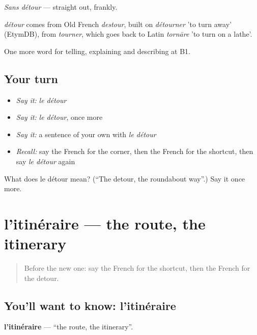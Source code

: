 \emph{Sans détour} — straight out, frankly.

\begin{cousinweb}
\emph{détour} comes from Old French \emph{destour}, built on \emph{détourner} 'to turn away' (EtymDB), from \emph{tourner}, which goes back to Latin \emph{tornāre} 'to turn on a lathe'.
\end{cousinweb}

\begin{grammarlens}[title={What you've built}]
One more word for telling, explaining and describing at B1.
\end{grammarlens}

\subsection*{Your turn}
\begin{itemize}
\raggedright
  \item \emph{Say it:} \emph{le détour}
  \item \emph{Say it:} \emph{le détour}, once more
  \item \emph{Say it:} a sentence of your own with \emph{le détour}
  \item \emph{Recall:} say the French for the corner, then the French for the shortcut, then say \emph{le détour} again
\end{itemize}

\begin{tcolorbox}[breakable,colback=teal!4,colframe=teal!35!black,title={Before you move on}]
What does le détour mean? (\textquotedblleft{}The detour, the roundabout way\textquotedblright{}.) Say it once more.
\end{tcolorbox}
\section[l'itinéraire]{l'itinéraire — the route, the itinerary}

\label{lesson:FR-C436-itineraire}



\begin{quote}
Before the new one: say the French for the shortcut, then the French for the detour.
\end{quote}

\subsection*{You'll want to know: l'itinéraire}
\textbf{l'itinéraire} — \textquotedblleft{}the route, the itinerary\textquotedblright{}.

